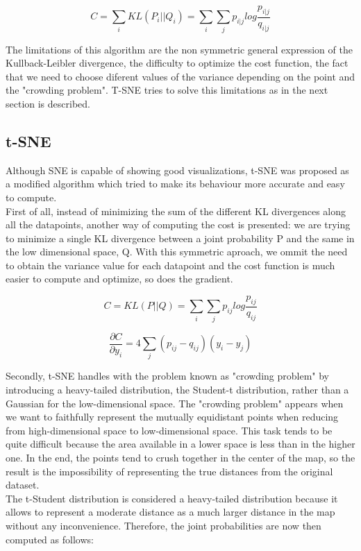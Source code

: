 \documentclass[a4paper,11pt,spanish]{report}
\begin{document}
$$ C = \sum\limits_{i} KL(P_{i}||Q_{i}) = \sum\limits_{i} \sum\limits_{j} p_{i|j} log \frac{p_{i|j}}{q_{i|j}}$$

The limitations of this algorithm are the non symmetric general expression of the Kullback-Leibler divergence, the difficulty to optimize the cost function, the fact that we need to choose diferent values of the variance depending on the point and the "crowding problem". T-SNE tries to solve this limitations as in the next section is described.

\subsection{t-SNE}
\label{ssec:tsne}

Although SNE is capable of showing good visualizations, t-SNE was proposed as a modified algorithm which tried to make its behaviour more accurate and easy to compute.\\
First of all, instead of minimizing the sum of the different KL divergences along all the datapoints, another way of computing the cost is presented: we are trying to minimize a single KL divergence between a joint probability P and the same in the low dimensional space, Q. With this symmetric aproach, we ommit the need to obtain the variance value for each datapoint and the cost function is much easier to compute and optimize, so does the gradient.

$$ C = KL(P||Q) = \sum\limits_{i} \sum\limits_{j} p_{ij} log \frac{p_{ij}}{q_{ij}}$$

$$ \frac{\partial C}{\partial y_{i}} = 4 \sum\limits_j (p_{ij} - q_{ij}) (y_{i} - y_{j}) $$

Secondly, t-SNE handles with the problem known as "crowding problem" by introducing a heavy-tailed distribution, the Student-t distribution, rather than a Gaussian for the low-dimensional space. The "crowding problem" appears when we want to faithfully represent the mutually equidistant points when reducing from high-dimensional space to low-dimensional space. This task tends to be quite difficult because the area available in a lower space is less than in the higher one. In the end, the points tend to crush together in the center of the map, so the result is the impossibility of representing the true distances from the original dataset.\\
The t-Student distribution is considered a heavy-tailed distribution because it allows to represent a moderate distance as a much larger distance in the map without any inconvenience.
Therefore, the joint probabilities are now then computed as follows:
\end{document}

